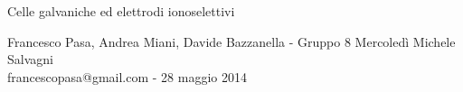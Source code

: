 \documentclass[11pt, twoside, a4paper]{article}
\begin{document}
\begin{center}

        {\huge Celle galvaniche ed elettrodi ionoselettivi}
    \vspace{0.1cm}

      	{Francesco Pasa, Andrea Miani, Davide Bazzanella - Gruppo 8 Mercoledì Michele Salvagni} \\
      	{francescopasa@gmail.com - 28 maggio 2014}
    \vspace{-0.2cm}

\end{center}





\end{document}
